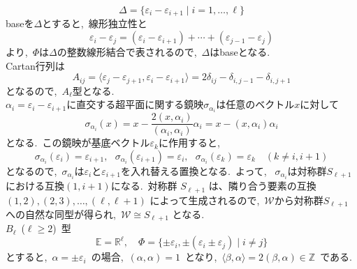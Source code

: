 \documentclass[uplatex,dvipdfmx]{jsarticle}
\begin{document}
\begin{myproof}
    \begin{equation*}
        \Delta = \{\varepsilon_i - \varepsilon_{i+1} \mid i = 1, \ldots, \ell\}
    \end{equation*}
    baseを$\Delta$とすると,~線形独立性と
    \begin{equation*}
        \varepsilon_i - \varepsilon_j = (\varepsilon_i - \varepsilon_{i+1}) + \cdots + (\varepsilon_{j-1} - \varepsilon_j)
    \end{equation*}
    より,~$\Phi$は$\Delta$の整数線形結合で表されるので,~$\Delta$はbaseとなる.~\\
    Cartan行列は
    \begin{equation*}
        A_{ij} = \langle \varepsilon_j - \varepsilon_{j+1}, \varepsilon_i - \varepsilon_{i+1} \rangle = 2\delta_{ij} - \delta_{i, j-1} - \delta_{i, j+1}
    \end{equation*}
    となるので,~$A_\ell$型となる.~\\
    $\alpha_i = \varepsilon_i - \varepsilon_{i+1}$に直交する超平面に関する鏡映$\sigma_{\alpha_i}$は任意のベクトル$x$に対して
    \begin{equation*}
        \sigma_{\alpha_i}(x) = x - \frac{2(x, \alpha_i)}{(\alpha_i, \alpha_i)} \alpha_i = x - (x, \alpha_i)\alpha_i
    \end{equation*}
    となる.~この鏡映が基底ベクトル$\varepsilon_k$に作用すると,~
    \begin{equation*}
        \sigma_{\alpha_i}(\varepsilon_i) = \varepsilon_{i+1},~~~\sigma_{\alpha_i}(\varepsilon_{i+1}) = \varepsilon_i,~~~\sigma_{\alpha_i}(\varepsilon_k) = \varepsilon_k \quad (k \neq i, i+1)
    \end{equation*}
    となるので,~$\sigma_{\alpha_i}$は$\varepsilon_i$と$\varepsilon_{i+1}$を入れ替える置換となる.~よって,~ $\sigma_{\alpha_i}$は対称群$S_{\ell+1}$における互換$(1, i+1)$になる.~対称群 ${S}_{\ell+1}$ は、隣り合う要素の互換 $(1, 2), (2, 3), \dots, (\ell, \ell+1)$ によって生成されるので,~$\mathscr{W}$から対称群$S_{\ell+1}$への自然な同型が得られ,~$\mathscr{W} \cong S_{\ell+1}$ となる.\\
    $B_\ell$~($\ell \geq 2$)~型\\
    \begin{equation*}
        \mathbb{E} = \mathbb{R}^\ell, \quad \Phi = \{\pm \varepsilon_i, \pm (\varepsilon_i \pm \varepsilon_j) \mid i \neq j\}
    \end{equation*}
    とすると,~$\alpha = \pm \varepsilon_i$~の場合,~$(\alpha, \alpha) = 1$~となり,~$\langle \beta, \alpha \rangle = 2(\beta, \alpha) \in \mathbb{Z}$~である.~\\

\end{myproof}
\end{document}
